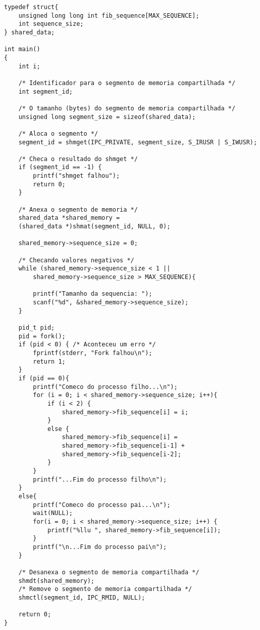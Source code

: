\documentclass[
	article,			%
	11pt,				%
	oneside,			%
	a4paper,			%
	english,			%
	brazil,				%
	sumario=tradicional
	]{abntex2}
\begin{document}
\begin{anexosenv}
\begin{lstlisting}
typedef struct{
    unsigned long long int fib_sequence[MAX_SEQUENCE];
    int sequence_size;
} shared_data;

int main()
{
    int i;

    /* Identificador para o segmento de memoria compartilhada */
    int segment_id;

    /* O tamanho (bytes) do segmento de memoria compartilhada */
    unsigned long segment_size = sizeof(shared_data);

    /* Aloca o segmento */
    segment_id = shmget(IPC_PRIVATE, segment_size, S_IRUSR | S_IWUSR);

    /* Checa o resultado do shmget */
    if (segment_id == -1) {
        printf("shmget falhou");
        return 0;
    }

    /* Anexa o segmento de memoria */
    shared_data *shared_memory = 
    (shared_data *)shmat(segment_id, NULL, 0);

    shared_memory->sequence_size = 0;

    /* Checando valores negativos */
    while (shared_memory->sequence_size < 1 || 
    	shared_memory->sequence_size > MAX_SEQUENCE){

        printf("Tamanho da sequencia: ");
        scanf("%d", &shared_memory->sequence_size);
    }

    pid_t pid;
    pid = fork();
    if (pid < 0) { /* Aconteceu um erro */
        fprintf(stderr, "Fork falhou\n");
        return 1;
    }
    if (pid == 0){
        printf("Comeco do processo filho...\n");
        for (i = 0; i < shared_memory->sequence_size; i++){
            if (i < 2) {
                shared_memory->fib_sequence[i] = i;
            }
            else {
                shared_memory->fib_sequence[i] = 
                shared_memory->fib_sequence[i-1] + 
                shared_memory->fib_sequence[i-2];
            }
        }
        printf("...Fim do processo filho\n");
    }
    else{
        printf("Comeco do processo pai...\n");
        wait(NULL);
        for(i = 0; i < shared_memory->sequence_size; i++) {
            printf("%llu ", shared_memory->fib_sequence[i]);
        }
        printf("\n...Fim do processo pai\n");
    }

    /* Desanexa o segmento de memoria compartilhada */
    shmdt(shared_memory);
    /* Remove o segmento de memoria compartilhada */
    shmctl(segment_id, IPC_RMID, NULL);

    return 0;
}
\end{lstlisting}
\newpage


\end{anexosenv}
\end{document}
